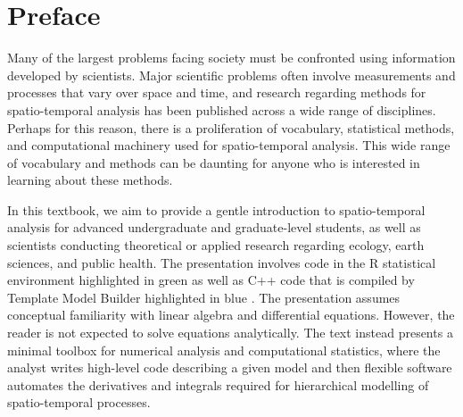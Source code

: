 \chapter*{Preface}

Many of the largest problems facing society must be confronted using information developed by scientists.  Major scientific problems often involve measurements and processes that vary over space and time, and research regarding methods for spatio-temporal analysis has been published across a wide range of disciplines.  Perhaps for this reason, there is a proliferation of vocabulary, statistical methods, and computational machinery used for spatio-temporal analysis.  This wide range of vocabulary and methods can be daunting for anyone who is interested in learning about these methods. 

In this textbook, we aim to provide a gentle introduction to spatio-temporal analysis for advanced undergraduate and graduate-level students, as well as scientists conducting theoretical or applied research regarding ecology, earth sciences, and public health.  The presentation involves code in the R statistical environment highlighted in \colorbox{backcolour}{green} \cite{r_core_team_r_2021} as well as C++ code that is compiled by Template Model Builder highlighted in \colorbox{backblue}{blue} \cite{kristensen_tmb_2016}.  The presentation assumes conceptual familiarity with linear algebra and differential equations.  However, the reader is not expected to solve equations analytically.  The text instead presents a minimal toolbox for numerical analysis and computational statistics, where the analyst writes high-level code describing a given model and then flexible software automates the derivatives and integrals required for hierarchical modelling of spatio-temporal processes.

